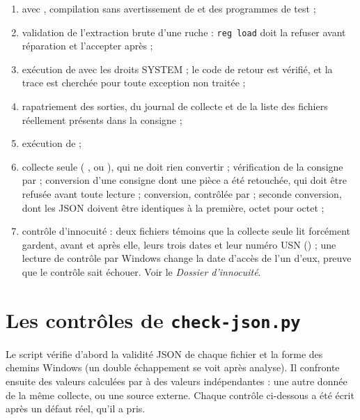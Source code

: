 \documentclass[11pt,a4paper,oneside]{report}
\begin{document}
\begin{enumerate}
  \item avec , compilation sans avertissement de \wac{} et des
    programmes de test ;
  \item validation de l'extraction brute d'une ruche : \texttt{reg load} doit la
    refuser avant réparation et l'accepter après ;
  \item exécution de \wac{} avec les droits SYSTEM ; le code de retour est
    vérifié, et la trace est cherchée pour toute exception non traitée ;
  \item rapatriement des sorties, du journal de collecte et de la liste des
    fichiers réellement présents dans la consigne ;
  \item exécution de  ;
  \item collecte seule (  , ou
    ), qui ne doit rien convertir ; vérification de la consigne
    par  ; conversion d'une consigne dont une pièce
    a été retouchée, qui doit être refusée avant toute lecture ; conversion,
    contrôlée par  ; seconde conversion, dont les JSON
    doivent être identiques à la première, octet pour octet ;
  \item contrôle d'innocuité : deux fichiers témoins que la collecte seule
    lit forcément gardent, avant et après elle, leurs trois dates et leur
    numéro USN () ; une lecture de contrôle par
    Windows change la date d'accès de l'un d'eux, preuve que le contrôle sait
    échouer. Voir le \emph{Dossier d'innocuité}.
\end{enumerate}

\section{Les contrôles de \texttt{check-json.py}}

Le script vérifie d'abord la validité JSON de chaque fichier et la forme des
chemins Windows (un double échappement se voit après analyse). Il confronte
ensuite des valeurs calculées par \wac{} à des valeurs indépendantes : une
autre donnée de la même collecte, ou une source externe. Chaque contrôle
ci-dessous a été écrit après un défaut réel, qu'il a pris.
\end{document}

